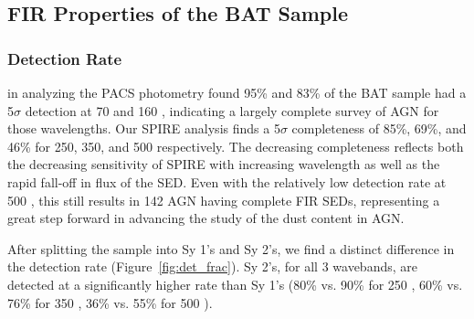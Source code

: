 \subsection{FIR Properties of the BAT Sample }
\subsubsection{Detection Rate}
\citet{Melendez:2014yu} in analyzing the PACS photometry found 95\% and 83\% of the BAT sample had a 5$\sigma$ detection at 70 and 160 \micron, indicating a largely complete survey of AGN for those wavelengths. Our SPIRE analysis finds a 5$\sigma$ completeness of 85\%, 69\%, and 46\% for 250, 350, and 500 \micron{} respectively. The decreasing completeness reflects both the decreasing sensitivity of SPIRE with increasing wavelength as well as the rapid fall-off in flux of the SED. Even with the relatively low detection rate at 500 \micron{}, this still results in 142 AGN having complete FIR SEDs, representing a great step forward in advancing the study of the dust content in AGN. 

After splitting the sample into Sy 1's and Sy 2's, we find a distinct difference in the detection rate (Figure~\ref{fig:det_frac}). Sy 2's, for all 3 wavebands, are detected at a significantly higher rate than Sy 1's (80\% vs. 90\% for 250 \um, 60\% vs. 76\% for 350 \um, 36\% vs. 55\% for 500 \um).